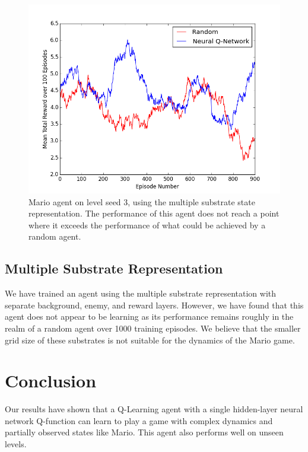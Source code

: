 \documentclass{article}
\begin{document}
  \begin{figure}
 \begin{center}
\includegraphics[scale=0.42]{seed3wSubstrates.png}
\caption{Mario agent on level seed 3, using the multiple substrate state representation. The performance of this agent does not reach a point where it exceeds the performance of what could be achieved by a random agent.}
\end{center}
\end{figure}
 
 \subsection{Multiple Substrate Representation}
 We have trained an agent using the multiple substrate representation with separate background, enemy, and reward layers. However, we have found that this agent does not appear to be learning as its performance remains roughly in the realm of a random agent over 1000 training episodes. We believe that the smaller grid size of these substrates is not suitable for the dynamics of the Mario game.
 
 \section{Conclusion}
 
Our results have shown that a Q-Learning agent with a single hidden-layer neural network Q-function can learn to play a game with complex dynamics and partially observed states like Mario. This agent also performs well on unseen levels.
 
\end{document}
